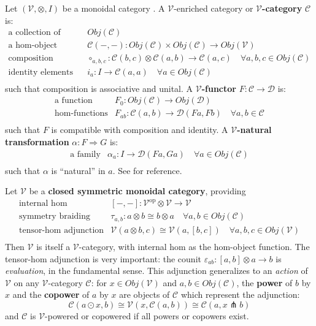 \documentclass[a4paper,UKenglish]{article}
\theoremstyle{definition}
\newcommand{\op}{\mathrm{op}}
\newcommand{\V}{\mathscr{V}}
\newcommand{\C}{\mathscr{C}}
\newcommand{\D}{\mathscr{D}}
\newcommand{\pfk}{\pitchfork}
\begin{document}
Let $(\V,\otimes,I)$ be a monoidal category \cite{maclane}. A $\V$-enriched category or \textbf{$\V$-category} $\C$ is:
\[\begin{array}{rl}
\text{a collection of objects} & Obj(\C)\\
\text{a hom-object function} & \C(-,-):Obj(\C) \times Obj(\C) \to Obj(\V)\\
\text{composition morphisms} & \circ_{a,b,c}:\C(b,c) \otimes \C(a,b) \to \C(a,c) \quad \forall a,b,c \in Obj(\C)\\
\text{identity elements} & i_a:I\to\C(a,a) \quad \forall a \in Obj(\C)\\
\end{array}\]
such that composition is associative and unital. A \textbf{$\V$-functor} $F:\C \to \D$ is:
\[\begin{array}{rl}
\text{a function} & F_0: Obj(\C) \to Obj(\D)\\
\text{hom-functions} & F_{ab}: \C(a,b) \to \D(Fa,Fb) \quad \forall a,b \in \C\\
\end{array}\]
such that $F$ is compatible with composition and identity. A \textbf{$\V$-natural transformation} $\alpha: F \Rightarrow G$ is:
\[\begin{array}{rl}
\text{a family} & \alpha_a: I \to \D(Fa,Ga) \quad \forall a \in Obj(\C)\\
\end{array}\]
such that $\alpha$ is ``natural'' in $a$. See \cite{enrich} for reference.

Let $\V$ be a \textbf{closed symmetric monoidal category}, providing
\[\begin{array}{rl}
\text{internal hom} & [-,-]:\V^\op\otimes \V \to \V\\
\text{symmetry braiding} & \tau_{a,b}:a\otimes b\cong b\otimes a \quad \forall a,b \in Obj(\C)\\
\text{tensor-hom adjunction} & \V(a\otimes b,c) \cong \V(a,[b,c]) \quad \forall a,b,c \in Obj(\V)\\
\end{array}\]
Then $\V$ is itself a $\V$-category, with internal hom as the hom-object function. The tensor-hom adjunction is very important: the counit $\varepsilon_{ab}: [a,b]\otimes a \to b$ is \textit{evaluation}, in the fundamental sense. This adjunction generalizes to an \textit{action} of $\V$ on any $\V$-category $\C$: for $x \in Obj(\V)$ and $a,b \in Obj(\C)$, the \textbf{power} of $b$ by $x$ and the \textbf{copower} of $a$ by $x$ are objects of $\C$ which represent the adjunction:
$$\C(a\odot x,b) \cong \V(x, \C(a,b)) \cong \C(a,x\pfk b)$$
and $\C$ is $\V$-powered or copowered if all powers or copowers exist.
\end{document}
